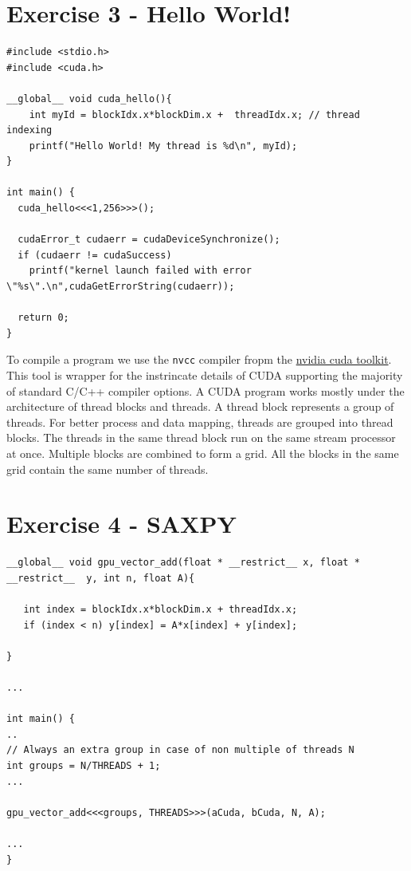 \documentclass[12pt]{article}
\begin{document}
\section{Exercise 3 - Hello World!}

\begin{lstlisting}[style=CStyle]
#include <stdio.h>
#include <cuda.h>

__global__ void cuda_hello(){
    int myId = blockIdx.x*blockDim.x +  threadIdx.x; // thread indexing
    printf("Hello World! My thread is %d\n", myId);
}

int main() {
  cuda_hello<<<1,256>>>();

  cudaError_t cudaerr = cudaDeviceSynchronize();
  if (cudaerr != cudaSuccess)
    printf("kernel launch failed with error \"%s\".\n",cudaGetErrorString(cudaerr));

  return 0;
}
    \end{lstlisting}
  
  To compile a program we use the \texttt{nvcc} compiler fropm the \href{https://docs.nvidia.com/cuda/cuda-compiler-driver-nvcc/index.html}{nvidia cuda toolkit}. This tool is wrapper for the instrincate details of CUDA supporting the majority of standard C/C++ compiler options. A CUDA program works mostly under the architecture of thread blocks and threads. A thread block represents a group of threads. For better process and data mapping, threads are grouped into thread blocks. The threads in the same thread block run on the same stream processor at once. Multiple blocks are combined to form a grid. All the blocks in the same grid contain the same number of threads. 
  



\section{Exercise 4 - SAXPY}


\begin{lstlisting}[style=CStyle]
  __global__ void gpu_vector_add(float * __restrict__ x, float * __restrict__  y, int n, float A){
    
   int index = blockIdx.x*blockDim.x + threadIdx.x;
   if (index < n) y[index] = A*x[index] + y[index];
        
} 

...

int main() {
..
// Always an extra group in case of non multiple of threads N
int groups = N/THREADS + 1; 
...

gpu_vector_add<<<groups, THREADS>>>(aCuda, bCuda, N, A); 

...
}

\end{lstlisting}
\end{document}

